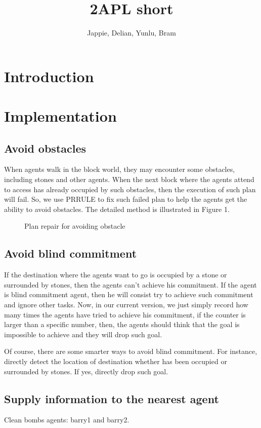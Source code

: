 \documentclass{article}
\begin{document}
\author{Jappie, Delian, Yunlu, Bram}
\title{2APL short}
\maketitle

\section{Introduction}
\section{Implementation}
\subsection{Avoid obstacles}
  When agents walk in the block world, they may encounter some obstacles,
  including stones and other agents. When the next block where the agents
  attend to access has already occupied by such obstacles, then the
  execution of such plan will fail. So, we use PRRULE to fix such failed
  plan to help the agents get the ability to avoid obstacles.
  The detailed method is illustrated in Figure 1.
  \begin{figure}
	  \caption{Plan repair for avoiding obstacle}
  \end{figure}
\subsection{Avoid blind commitment}
If the destination where the agents want to go is occupied by a stone or
surrounded by stones, then the agents can't achieve his commitment.
If the agent is blind commitment agent, then he will consist try to achieve
such commitment and ignore other tasks. Now, in our current version,
we just simply record how many times the agents have tried to achieve his
commitment, if the counter is larger than a specific number, then,
the agents should think that the goal is impossible to achieve and they
will drop such goal.

Of course, there are some smarter ways to avoid blind commitment.
For instance, directly detect the location of destination whether
has been occupied or surrounded by stones. If yes, directly drop
such goal.
\subsection{Supply information to the nearest agent}
Clean bombs agents: barry1 and barry2.
\end{document}
